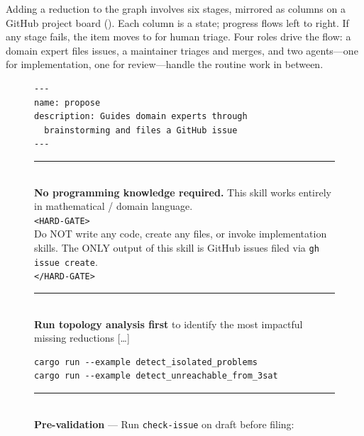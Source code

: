 \documentclass[conference]{IEEEtran}
\newcommand{\col}[1]{%
  \tikz[baseline=(X.base)]{%
    \node[draw=gray!80, fill=gray!10, rounded corners=2pt,
          inner sep=2pt,
          font=\scriptsize\sffamily] (X) {#1};%
  }%
}
\begin{document}
Adding a reduction to the graph involves six stages, mirrored as columns on a GitHub project board ().
Each column is a state; progress flows left to right.
If any stage fails, the item moves to \col{OnHold} for human triage.
Four roles drive the flow: a domain expert files issues, a maintainer triages and merges, and two agents---one for implementation, one for review---handle the routine work in between.

\begin{figure}[t]
  \centering
  \begin{tcolorbox}[
    colback=gray!5, colframe=gray!80,
    title={\textbf{\texttt{propose}} --- advisor skill (excerpts)},
    fonttitle=\footnotesize, boxrule=0.4pt, arc=2pt, left=4pt, right=4pt, top=2pt, bottom=2pt
  ]
  \footnotesize
  \begin{lstlisting}[basicstyle=\ttfamily\footnotesize, numbers=none, frame=none, aboveskip=0pt, belowskip=0pt, xleftmargin=4pt]
---
name: propose
description: Guides domain experts through
  brainstorming and files a GitHub issue
---
  \end{lstlisting}
  \vspace{-4pt}
  \rule{\linewidth}{0.3pt}\\[3pt]
  \textbf{No programming knowledge required.}
  This skill works entirely in mathematical / domain language.\\[3pt]
  \texttt{<HARD-GATE>}\\
  Do NOT write any code, create any files, or invoke implementation skills.
  The ONLY output of this skill is GitHub issues filed via \texttt{gh issue create}.\\
  \texttt{</HARD-GATE>}\\[3pt]
  \rule{\linewidth}{0.3pt}\\[3pt]
  \textbf{Run topology analysis first} to identify the most impactful missing reductions [\ldots]\\
  \begin{lstlisting}[basicstyle=\ttfamily\footnotesize, numbers=none, frame=none, aboveskip=-5pt, belowskip=2pt, xleftmargin=4pt]
cargo run --example detect_isolated_problems
cargo run --example detect_unreachable_from_3sat
  \end{lstlisting}
  \vspace{-2pt}
  \rule{\linewidth}{0.3pt}\\[3pt]
  \textbf{Pre-validation} --- Run \texttt{check-issue} on draft before filing:\\[2pt]
  \begin{tabular}{@{}r@{~}l@{}}

\end{tabular}
\end{tcolorbox}
\end{figure}
\end{document}
